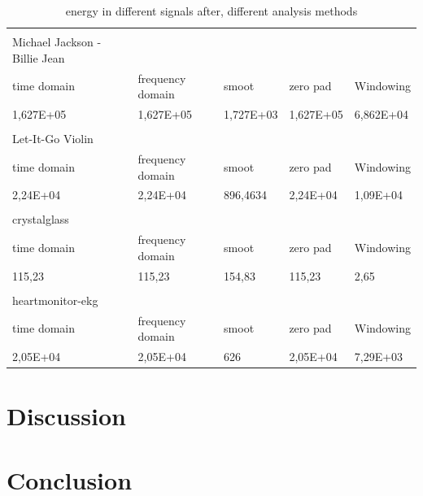 \begin{table}[]
\begin{tabularx}{\textwidth}{Xllll}
                              &                  &           &           &           \\
Michael Jackson - Billie Jean &                  &           &           &           \\
time domain                   & frequency domain & smoot     & zero pad  & Windowing \\
1,627E+05                     & 1,627E+05        & 1,727E+03 & 1,627E+05 & 6,862E+04 \\
                              &                  &           &           &           \\
Let-It-Go Violin              &                  &           &           &           \\
time domain                   & frequency domain & smoot     & zero pad  & Windowing \\
2,24E+04                      & 2,24E+04         & 896,4634  & 2,24E+04  & 1,09E+04  \\
                              &                  &           &           &           \\
crystalglass                  &                  &           &           &           \\
time domain                   & frequency domain & smoot     & zero pad  & Windowing \\
115,23                        & 115,23           & 154,83    & 115,23    & 2,65      \\
                              &                  &           &           &           \\
heartmonitor-ekg              &                  &           &           &           \\
time domain                   & frequency domain & smoot     & zero pad  & Windowing \\
2,05E+04                      & 2,05E+04         & 626       & 2,05E+04  & 7,29E+03 
\end{tabularx}

\caption{energy in different signals after, different analysis methods }
\label{tab:Energy}
\end{table}

\section{Discussion}

\section{Conclusion}